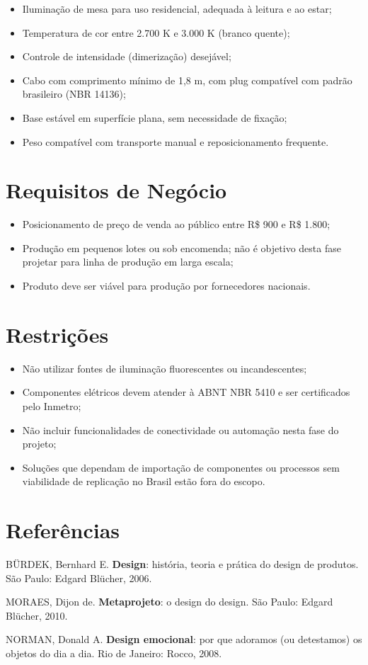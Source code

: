 \documentclass[
  12pt,
  a4paper,
  oneside,
  brazil
]{article}
\let\oldsection\section
\renewcommand{\section}{\clearpage\oldsection}
\providecommand{\tightlist}{\setlength{\itemsep}{0pt}\setlength{\parskip}{0pt}}
\begin{document}
\begin{itemize}
\tightlist
\item Iluminação de mesa para uso residencial, adequada à leitura e ao estar;
\item Temperatura de cor entre 2.700 K e 3.000 K (branco quente);
\item Controle de intensidade (dimerização) desejável;
\item Cabo com comprimento mínimo de 1,8 m, com plug compatível com padrão brasileiro
  (NBR 14136);
\item Base estável em superfície plana, sem necessidade de fixação;
\item Peso compatível com transporte manual e reposicionamento frequente.
\end{itemize}

\section{Requisitos de Negócio}

\begin{itemize}
\tightlist
\item Posicionamento de preço de venda ao público entre R\$ 900 e R\$ 1.800;
\item Produção em pequenos lotes ou sob encomenda; não é objetivo desta fase projetar
  para linha de produção em larga escala;
\item Produto deve ser viável para produção por fornecedores nacionais.
\end{itemize}

\section{Restrições}

\begin{itemize}
\tightlist
\item Não utilizar fontes de iluminação fluorescentes ou incandescentes;
\item Componentes elétricos devem atender à ABNT NBR 5410 e ser certificados pelo
  Inmetro;
\item Não incluir funcionalidades de conectividade ou automação nesta fase do projeto;
\item Soluções que dependam de importação de componentes ou processos sem viabilidade
  de replicação no Brasil estão fora do escopo.
\end{itemize}

\section{Referências}\label{referencias}

BÜRDEK, Bernhard E. \textbf{Design}: história, teoria e prática do design de produtos.
São Paulo: Edgard Blücher, 2006.

MORAES, Dijon de. \textbf{Metaprojeto}: o design do design. São Paulo: Edgard Blücher,
2010.

NORMAN, Donald A. \textbf{Design emocional}: por que adoramos (ou detestamos) os objetos
do dia a dia. Rio de Janeiro: Rocco, 2008.
\end{document}
